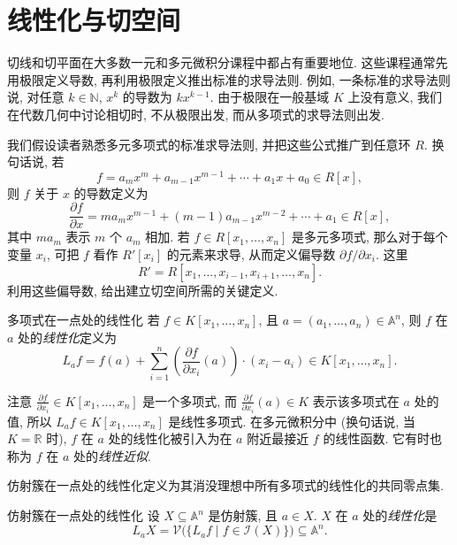 \section{线性化与切空间}\label{sec:linearizations-and-tangent-spaces}

切线和切平面在大多数一元和多元微积分课程中都占有重要地位. 这些课程通常先用极限定义导数, 再利用极限定义推出标准的求导法则. 例如, 一条标准的求导法则说, 对任意 $k\in\mathbb{N}$, $x^{k}$ 的导数为 $kx^{k-1}$. 由于极限在一般基域 $K$ 上没有意义, 我们在代数几何中讨论相切时, 不从极限出发, 而从多项式的求导法则出发.

我们假设读者熟悉多元多项式的标准求导法则, 并把这些公式推广到任意环 $R$. 换句话说, 若
\[
  f=a_{m}x^{m}+a_{m-1}x^{m-1}+\cdots+a_{1}x+a_{0}\in R[x],
\]
则 $f$ 关于 $x$ 的导数定义为
\[
  \frac{\partial f}{\partial x}=ma_{m}x^{m-1}+(m-1)a_{m-1}x^{m-2}+\cdots+a_{1}\in R[x],
\]
其中 $ma_{m}$ 表示 $m$ 个 $a_{m}$ 相加. 若 $f\in R[x_{1},\ldots,x_{n}]$ 是多元多项式, 那么对于每个变量 $x_{i}$, 可把 $f$ 看作 $R'[x_{i}]$ 的元素来求导, 从而定义偏导数 $\partial f/\partial x_{i}$. 这里
\[
  R'=R[x_{1},\ldots,x_{i-1},x_{i+1},\ldots,x_{n}].
\]
利用这些偏导数, 给出建立切空间所需的关键定义.

\begin{Definition}{多项式在一点处的线性化}\leavevmode\label{def:linearization-of-polynomial}
若 $f\in K[x_{1},\ldots,x_{n}]$, 且 $a=(a_{1},\ldots,a_{n})\in\mathbb{A}^{n}$, 则 $f$ 在 $a$ 处的\emph{线性化}定义为
\[
  L_{a}f=f(a)+\sum_{i=1}^{n}\left(\frac{\partial f}{\partial x_{i}}(a)\right)\cdot(x_{i}-a_{i})
    \in K[x_{1},\ldots,x_{n}].
\]
\end{Definition}

注意 $\frac{\partial f}{\partial x_{i}}\in K[x_{1},\ldots,x_{n}]$ 是一个多项式, 而 $\frac{\partial f}{\partial x_{i}}(a)\in K$ 表示该多项式在 $a$ 处的值, 所以 $L_{a}f\in K[x_{1},\ldots,x_{n}]$ 是线性多项式. 在多元微积分中 (换句话说, 当 $K=\mathbb{R}$ 时), $f$ 在 $a$ 处的线性化被引入为在 $a$ 附近最接近 $f$ 的线性函数. 它有时也称为 $f$ 在 $a$ 处的\emph{线性近似}.

仿射簇在一点处的线性化定义为其消没理想中所有多项式的线性化的共同零点集.

\begin{Definition}{仿射簇在一点处的线性化}\leavevmode\label{def:linearization-of-affine-variety}
设 $X\subseteq\mathbb{A}^{n}$ 是仿射簇, 且 $a\in X$. $X$ 在 $a$ 处的\emph{线性化}是
\[
  L_{a}X=\mathcal{V}\bigl(\{L_{a}f\mid f\in\mathcal{I}(X)\}\bigr)\subseteq\mathbb{A}^{n}.
\]
\end{Definition}

